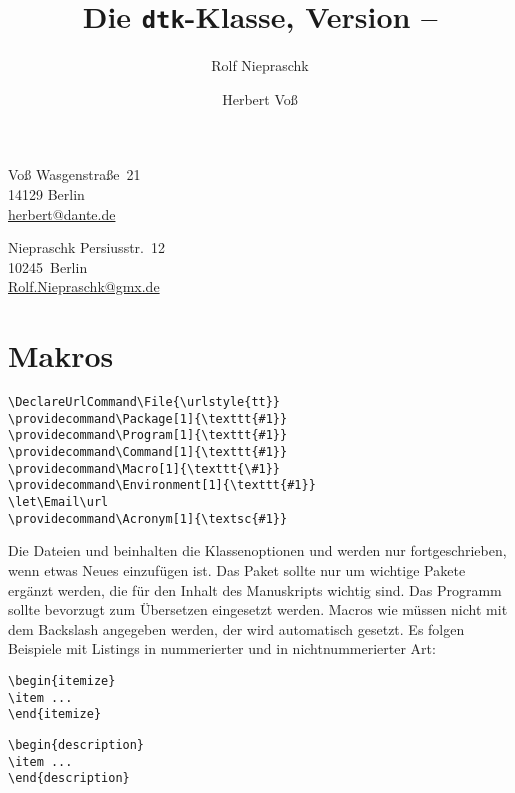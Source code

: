 \documentclass[12,ngerman]{dtk}
\begin{document}
\title{Die \texttt{dtk}-Klasse, \small Version \DTKversion -- \DTKdate}
\author{Rolf Niepraschk\and Herbert Voß}
\address{Herbert}{Voß}
    {Wasgenstraße~21\\
     14129 Berlin\\
     \protect\url{herbert@dante.de}}
\address{Rolf}{Niepraschk}%
    {Persiusstr.~12\\
     10245~Berlin\\
     \protect\url{Rolf.Niepraschk@gmx.de}}
\maketitle

\section{Makros}

\begin{verbatim}
\DeclareUrlCommand\File{\urlstyle{tt}}
\providecommand\Package[1]{\texttt{#1}}
\providecommand\Program[1]{\texttt{#1}}
\providecommand\Command[1]{\texttt{#1}}
\providecommand\Macro[1]{\texttt{\#1}}
\providecommand\Environment[1]{\texttt{#1}}
\let\Email\url
\providecommand\Acronym[1]{\textsc{#1}}
\end{verbatim}

Die Dateien  und  beinhalten die Klassenoptionen und
werden nur fortgeschrieben, wenn etwas Neues einzufügen ist. Das Paket
 sollte nur um wichtige Pakete ergänzt werden, die für den Inhalt
des Manuskripts wichtig sind. Das Programm  sollte bevorzugt
zum Übersetzen eingesetzt werden. Macros wie  müssen nicht mit
dem Backslash angegeben werden, der wird automatisch gesetzt. Es folgen
Beispiele mit Listings in nummerierter und in nichtnummerierter Art:

\begin{lstlisting}[style=DTKlstNumber]
\begin{itemize}
\item ...
\end{itemize}
\end{lstlisting}

\begin{lstlisting}[style=DTKlstNoNumber]
\begin{description}
\item ...
\end{description}
\end{lstlisting}
\end{document}
